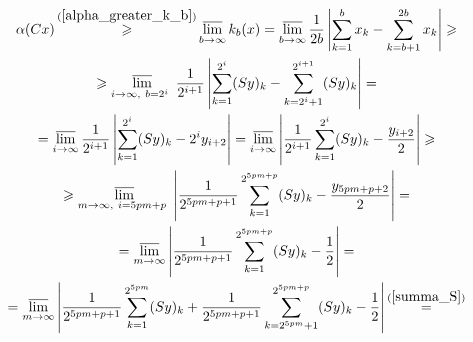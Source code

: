 \begin{multline*}
	\alpha (Cx) \mathop{\geq}^{(\ref{alpha_greater_k_b})}
	\varlimsup_{b\to \infty} k_b(x) =
	\varlimsup_{b\to \infty}\frac{1}{2b}\left|
		\sum_{k=1}^{b}x_k - \sum_{k=b+1}^{2b}x_k
	\right| \geq
	\\ \geq
	\varlimsup_{
		i\to \infty,~
		b=2^i~
	}\frac{1}{2^{i+1}}\left|
		\sum_{k=1}^{2^i}(Sy)_k - \sum_{k=2^i+1}^{2^{i+1}}(Sy)_k
	\right| =
	\\=
	\varlimsup_{i\to \infty}\frac{1}{2^{i+1}}\left|
		\sum_{k=1}^{2^i}(Sy)_k - 2^i y_{i+2}
	\right| =
	\varlimsup_{i\to \infty}\left|
		\frac{1}{2^{i+1}}\sum_{k=1}^{2^i}(Sy)_k - \frac{y_{i+2}}{2}
	\right| \geq
	\\ \geq
	\varlimsup_{
		m\to \infty,~
		i=5pm+p~
	}\left|
		\frac{1}{2^{5pm+p+1}}\sum_{k=1}^{2^{5pm+p}}(Sy)_k - \frac{y_{5pm+p+2}}{2}
	\right| =
	\\=
	\varlimsup_{m\to \infty}\left|
		\frac{1}{2^{5pm+p+1}}\sum_{k=1}^{2^{5pm+p}}(Sy)_k - \frac{1}{2}
	\right| =
	\\=
	\varlimsup_{m\to \infty}\left|
		\frac{1}{2^{5pm+p+1}}\sum_{k=1}^{2^{5pm}}(Sy)_k
		+
		\frac{1}{2^{5pm+p+1}}\sum_{k=2^{5pm}+1}^{2^{5pm+p}}(Sy)_k
		- \frac{1}{2}
	\right|
	\mathop{=}^{(\ref{summa_S})}
\end{multline*}
